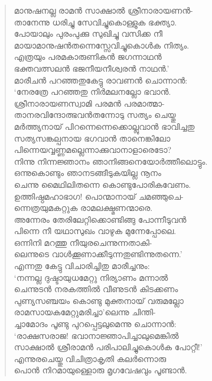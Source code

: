 \begin{verse}
മാനുഷനല്ല രാമന്‍ സാക്ഷാല്‍ ശ്രീനാരായണന്‍-\\
താനേന്നു ധരിച്ചു സേവിച്ചുകൊള്ളുക ഭക്ത്യാ.\\
പോയാലും പുരംപുക്കു സുഖിച്ചു വസിക്ക നീ\\
മായാമാനുഷന്‍തന്നെസ്സേവിച്ചുകൊള്‍ക നിത്യം.\\
എത്രയും പരമകാരുണികന്‍ ജഗന്നാഥന്‍\\
ഭക്തവത്സലന്‍ ഭജനീയനീശ്വരന്‍ നാഥന്‍.’\\
മാരീചന്‍ പറഞ്ഞതുകേട്ടു രാവണന്‍ ചൊന്നാന്‍:\\
‘നേരത്രേ പറഞ്ഞതു നിര്‍മലനല്ലോ ഭവാന്‍.\\
ശ്രീനാരായണസ്വാമി പരമന്‍ പരമാത്മാ-\\
താനരവിന്ദോത്ഭവന്‍തന്നോടു സത്യം ചെയ്തു\\
മര്‍ത്ത്യനായ് പിറന്നെന്നെക്കൊല്ലുവാന്‍ ഭാവിച്ചതു\\
സത്യസങ്കല്പനായ ഭഗവാന്‍ താനെങ്കിലോ\\
പിന്നെയവ്വണ്ണമല്ലെന്നാക്കുവാനാളാരെടോ?\\
നിന്നു നിന്നജ്ഞാനം ഞാനിങ്ങനെയോര്‍ത്തീലൊട്ടും.\\
ഒന്നുകൊണ്ടും ഞാനടങ്ങീടുകയില്ല നൂനം\\
ചെന്നു മൈഥിലിതന്നെ കൊണ്ടുപോരികവേണം.\\
ഉത്തിഷ്ഠമഹാഭാഗ! പൊന്മാനായ് ചമഞ്ഞുചെ-\\
ന്നെത്രയുമകറ്റുക രാമലക്ഷ്മണന്മാരെ.\\
അന്നേരം തേരിലേറ്റിക്കൊണ്ടിങ്ങു പോന്നീടുവന്‍\\
പിന്നെ നീ യഥാസുഖം വാഴുക മുന്നേപ്പോലെ.\\
ഒന്നിനി മറത്തു നീയുരചെന്നുന്നതാകി-\\
ലെന്നുടെ വാള്‍ക്കൂണാക്കീടുന്നതുണ്ടിന്നുതന്നെ.’\\
എന്നതു കേട്ടു വിചാരിച്ചിതു മാരീച്ചനും:\\
‘നന്നല്ല ദുഷ്ടായുധമേറ്റു നിര്യാണം മന്നാല്‍\\
ചെന്നുടന്‍ നരകത്തില്‍ വീണുടന്‍ കിടക്കണം\\
പുണ്യസഞ്ചയം കൊണ്ടു മുക്തനായ് വരുമല്ലോ\\
രാമസായകമേറ്റുമരിച്ചാ’ലെന്നു ചിന്തി-\\
ച്ചാമോദം പൂണ്ടു പുറപ്പെട്ടലുമെന്നു ചൊന്നാന്‍:\\
‘രാക്ഷസരാജ! ഭവാനാജ്ഞാപിച്ചാലുമെങ്കില്‍\\
സാക്ഷാല്‍ ശ്രീരാമന്‍ പരിപാലിച്ചുകൊള്‍ക പോറ്റീ!’\\
എന്നുരചെയ്തു വിചിത്രാകൃതി കലര്‍ന്നൊരു\\
പൊന്‍ നിറമായുള്ളൊരു മൃഗവേഷവും പൂണ്ടാന്‍.\\

\end{verse}
